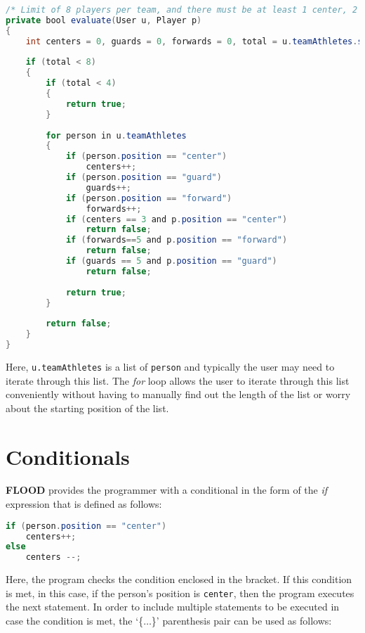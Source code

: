 \documentclass[12pt]{report}
\begin{document}
\begin{lstlisting}[language=Java,label=some-code,caption=For loop]
/* Limit of 8 players per team, and there must be at least 1 center, 2 guards and 2 forwards per team. */
private bool evaluate(User u, Player p)
{
	int centers = 0, guards = 0, forwards = 0, total = u.teamAthletes.size();
	
	if (total < 8)
	{
		if (total < 4)
		{
			return true;
		}
		
		for person in u.teamAthletes
		{
			if (person.position == "center")
				centers++;
			if (person.position == "guard")
				guards++;
			if (person.position == "forward")
				forwards++;
			if (centers == 3 and p.position == "center")
				return false;
			if (forwards==5 and p.position == "forward")
				return false;
			if (guards == 5 and p.position == "guard")
				return false;
		
			return true;
		}
		
		return false;
	}
}
\end{lstlisting}

\begin{doublespace}
Here, \texttt{u.teamAthletes} is a list of \texttt{person} and typically the user may need to iterate through this list. The \textit{for} loop allows the user to iterate through this list conveniently without having to manually find out the length of the list or worry about the starting position of the list.
\end{doublespace}

\section{Conditionals}

\begin{doublespace}
\textbf{FLOOD} provides the programmer with a conditional in the form of the \textit{if} expression that is defined as follows:
\end{doublespace}

\begin{lstlisting}[language=Java,label=some-code,caption=if conditional]
if (person.position == "center")
	centers++;
else
	centers --;
\end{lstlisting}

\begin{doublespace}
Here, the program checks the condition enclosed in the bracket. If this condition is met, in this case, if the person's position is \texttt{center}, then the program executes the next statement. In order to include multiple statements to be executed in case the condition is met, the `\{$\ldots$\}'
parenthesis pair can be used as follows:
\end{doublespace}
\end{document}
